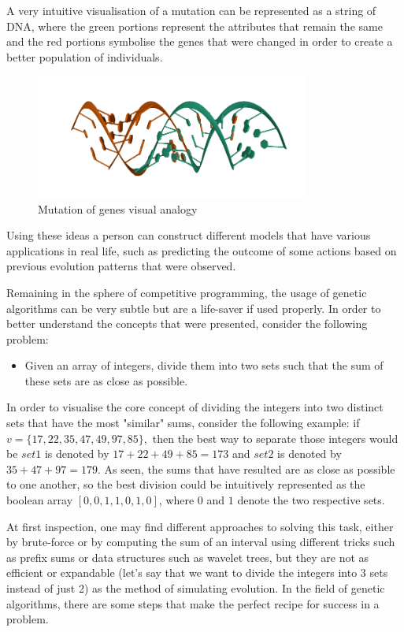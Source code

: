 \documentclass[letterpaper]{article}
\begin{document}
A very intuitive visualisation of a mutation can be represented as a string of DNA, where the green portions represent the attributes that remain the same and the red portions symbolise the genes that were changed in order to create a better population of individuals. 

\begin{figure} [h!]
\centering
\includegraphics[width=0.80\textwidth]{pngOfDiagrams/gene_mutation (1).png}
\caption{Mutation of genes visual analogy}
\end{figure}

\newpage

Using these ideas a person can construct different models that have various applications in real life, such as predicting the outcome of some actions based on previous evolution patterns that were observed. 

Remaining in the sphere of competitive programming, the usage of genetic algorithms can be very subtle but are a life-saver if used properly. In order to better understand the concepts that were presented, consider the following problem:

\begin{itemize}
    \item Given an array of integers, divide them into two sets such that the sum of these sets are as close as possible.
\end{itemize}

In order to visualise the core concept of dividing the integers into two distinct sets that have the most "similar" sums, consider the following example: if $v = \{ 17, 22, 35, 47, 49, 97, 85 \}, $ then the best way to separate those integers would be $set1 $ is denoted by $17+22+49+85 = 173$ and $set2$ is denoted by $ 35+47+97 = 179$. As seen, the sums that have resulted are as close as possible to one another, so the best division could be intuitively represented as the boolean array $[0, 0, 1, 1, 0, 1, 0]$, where $0$ and $1$ denote the two respective sets.

At first inspection, one may find different approaches to solving this task, either by brute-force or by computing the sum of an interval using different tricks such as prefix sums or data structures such as wavelet trees, but they are not as efficient or expandable (let's say that we want to divide the integers into 3 sets instead of just 2) as the method of simulating evolution. In the field of genetic algorithms, there are some steps that make the perfect recipe for success in a problem. 
\end{document}
